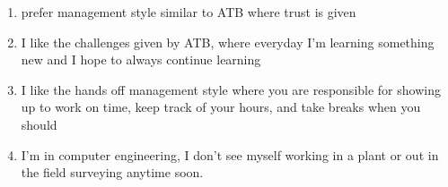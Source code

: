 \documentclass[letterpaper,12pt]{article}
\begin{document}
\begin{enumerate}
 \item prefer management style similar to ATB where trust is given
 \item I like the challenges given by ATB, where everyday I'm learning something new and I hope
       to always continue learning
 \item I like the hands off management style where you are responsible for showing up to work on time, keep track of your hours,
       and take breaks when you should
 \item I'm in computer engineering, I don't see myself working in a plant or out in the field surveying anytime soon.
\end{enumerate}



\nocite{*}

\end{document}
